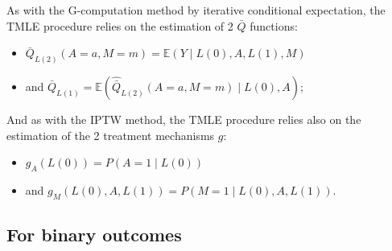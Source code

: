 \documentclass[
]{book}
\providecommand{\tightlist}{%
  \setlength{\itemsep}{0pt}\setlength{\parskip}{0pt}}
\begin{document}
As with the G-computation method by iterative conditional expectation, the TMLE procedure relies on the estimation of 2 \(\bar{Q}\) functions:

\begin{itemize}
\tightlist
\item
  \(\bar{Q}_{L(2)}(A=a,M=m) = \mathbb{E}(Y \mid L(0),A,L(1),M)\)
\item
  and \(\bar{Q}_{L(1)} = \mathbb{E}(\hat{\bar{Q}}_{L(2)}(A=a,M=m) \mid L(0),A)\);
\end{itemize}

And as with the IPTW method, the TMLE procedure relies also on the estimation of the 2 treatment mechanisms \(g\):

\begin{itemize}
\tightlist
\item
  \(g_A(L(0)) = P(A=1 \mid L(0))\)
\item
  and \(g_M(L(0),A,L(1)) = P(M=1 \mid L(0),A,L(1))\).
\end{itemize}

\subsection{For binary outcomes}\label{for-binary-outcomes}
\end{document}
